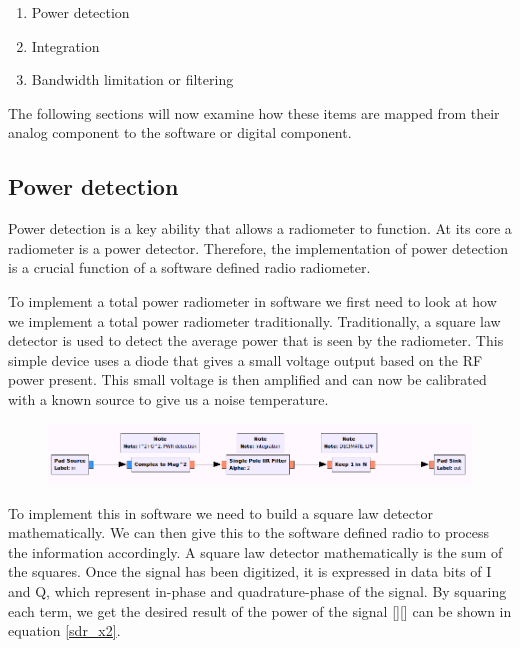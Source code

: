 \begin{enumerate}
\item Power detection
\item Integration
\item Bandwidth limitation or filtering
\end{enumerate}

The following sections will now examine how these items are mapped from their analog component to the software or digital component.
\subsection{Power detection}
Power detection is a key ability that allows a radiometer to function.  At its core a radiometer is a power detector.  Therefore, the implementation of power detection is a crucial function of a software defined radio radiometer.

To implement a total power radiometer in software we first need to look at how we implement a total power radiometer traditionally.  Traditionally, a square law detector is used to detect the average power that is seen by the radiometer.  This simple device uses a diode that gives a small voltage output based on the RF power present.  This small voltage is then amplified and can now be calibrated with a known source to give us a noise temperature.  

{\begin{figure}[h!tb] 
\centering
\includegraphics[width=17cm]{Images/TPR_grc.png}
\label{square_block}
\end{figure}
}

To implement this in software we need to build a square law detector mathematically.  We can then give this to the software defined radio to process the information accordingly.  A square law detector mathematically is the sum of the squares.  Once the signal has been digitized, it is expressed in data bits of I and Q, which represent in-phase and quadrature-phase of the signal.  By squaring each term, we get the desired result of the power of the signal [\cite{Sarijari}][\cite{Rashid}] can be shown in equation \ref{sdr_x2}.

